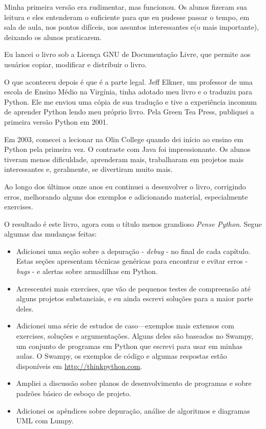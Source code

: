 \documentclass[10pt]{book}
\begin{document}
Minha primeira versão era rudimentar, mas funcionou. Os alunos fizeram sua leitura
e eles entenderam o suficiente para que eu pudesse passar o tempo, em sala de aula, nos
pontos difíceis, nos assuntos interessantes e(o mais importante), deixando
os alunos praticarem.

Eu lancei o livro sob a Licença GNU de Documentação Livre,
que permite aos usuários copiar, modificar e distribuir o livro.

O que aconteceu depois é que é a parte legal. Jeff Elkner, um professor de uma escola
de Ensino Médio na Virgínia, tinha adotado meu livro e o traduziu para
Python. Ele me enviou uma cópia de sua tradução e tive a
experiência incomum de aprender Python lendo meu próprio livro.
Pela Green Tea Press, publiquei a primeira versão Python em 2001.

Em 2003, comecei a lecionar na Olin College quando dei início ao ensino em
Python pela primeira vez. O contraste com Java foi impressionante.
Os alunos tiveram menos dificuldade, aprenderam mais, trabalharam em projetos
mais interessantes e, geralmente, se divertiram muito mais.

Ao longo dos últimos onze anos eu continuei a desenvolver o livro,
corrigindo erros, melhorando alguns dos exemplos e
adicionando material, especialmente exercises.

O resultado é este livro, agora com o título menos grandioso
{\em Pense Python}. Segue algumas das mudanças feitas:

\begin{itemize}

\item Adicionei uma seção sobre a depuração - {\em debug} - no final de cada capítulo.
  Estas seções apresentam técnicas genéricas para encontrar e evitar
  erros - {\em bugs} -  e alertas sobre armadilhas em Python.

\item Acrescentei mais exercises, que vão de pequenos testes de
  compreensão até alguns projetos substanciais, e eu ainda escrevi
  soluções para a maior parte deles.

\item Adicionei uma série de estudos de caso---exemplos mais extensos com
exercises, soluções e argumentações. Alguns deles são baseados no
Swampy, um conjunto de programas em Python que escrevi para usar em minhas aulas.
O Swampy, os exemplos de código e algumas respostas estão disponíveis em
\url{http://thinkpython.com}.

\item Ampliei a discussão sobre planos de desenvolvimento de programas
 e sobre padrões básico de esboço de projeto.

\item Adicionei os apêndices sobre depuração, análise de algoritmos e diagramas
UML com Lumpy.

\end{itemize}
\end{document}
